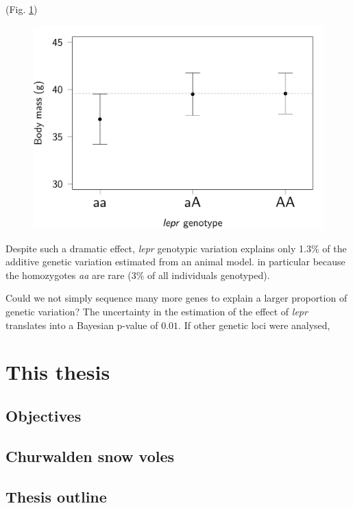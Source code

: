 (Fig. \ref{fig:leprpheno})
\begin{figure}[ht]
	\includegraphics[width=\textwidth]{FiguresGeneral/PhenoEffect-1}
	\caption{}
	\label{fig:leprpheno}
\end{figure}

Despite such a dramatic effect, \emph{lepr} genotypic variation explains only 1.3\% of the additive genetic variation estimated from an animal model. in particular because the homozygotes \emph{aa} are rare (3\% of all individuals genotyped).

Could we not simply sequence many more genes to explain a larger proportion of genetic variation?
The uncertainty in the estimation of the effect of \emph{lepr} translates into a Bayesian p-value of $0.01$. 
If other genetic loci were analysed, 


\section{This thesis}

\subsection{Objectives}

\subsection{Churwalden snow voles}

\subsection{Thesis outline}


